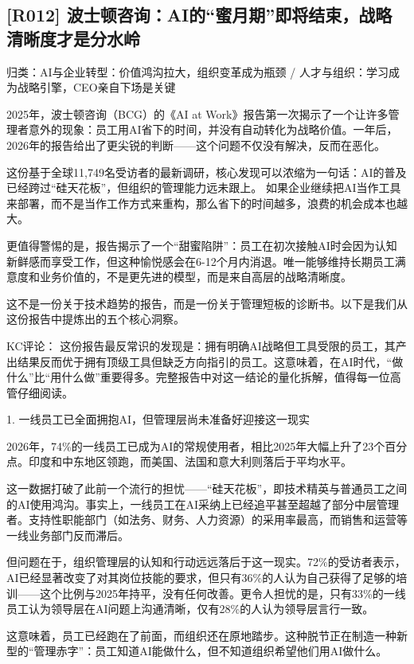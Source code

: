 \documentclass[11pt]{ctexart}
\begin{document}
\subsection{[R012] 波士顿咨询：AI的“蜜月期”即将结束，战略清晰度才是分水岭}
{\small\color{refgray}归类：AI与企业转型：价值鸿沟拉大，组织变革成为瓶颈 / 人才与组织：学习成为战略引擎，CEO亲自下场是关键}

2025年，波士顿咨询（BCG）的《AI at Work》报告第一次揭示了一个让许多管理者意外的现象：员工用AI省下的时间，并没有自动转化为战略价值。一年后，2026年的报告给出了更尖锐的判断——这个问题不仅没有解决，反而在恶化。

这份基于全球11,749名受访者的最新调研，核心发现可以浓缩为一句话：AI的普及已经跨过“硅天花板”，但组织的管理能力远未跟上。 如果企业继续把AI当作工具来部署，而不是当作工作方式来重构，那么省下的时间越多，浪费的机会成本也越大。

更值得警惕的是，报告揭示了一个“甜蜜陷阱”：员工在初次接触AI时会因为认知新鲜感而享受工作，但这种愉悦感会在6-12个月内消退。唯一能够维持长期员工满意度和业务价值的，不是更先进的模型，而是来自高层的战略清晰度。

这不是一份关于技术趋势的报告，而是一份关于管理短板的诊断书。以下是我们从这份报告中提炼出的五个核心洞察。

KC评论： 这份报告最反常识的发现是：拥有明确AI战略但工具受限的员工，其产出结果反而优于拥有顶级工具但缺乏方向指引的员工。这意味着，在AI时代，“做什么”比“用什么做”重要得多。完整报告中对这一结论的量化拆解，值得每一位高管仔细阅读。

1. 一线员工已全面拥抱AI，但管理层尚未准备好迎接这一现实

2026年，74\%的一线员工已成为AI的常规使用者，相比2025年大幅上升了23个百分点。印度和中东地区领跑，而美国、法国和意大利则落后于平均水平。

这一数据打破了此前一个流行的担忧——“硅天花板”，即技术精英与普通员工之间的AI使用鸿沟。事实上，一线员工在AI采纳上已经追平甚至超越了部分中层管理者。支持性职能部门（如法务、财务、人力资源）的采用率最高，而销售和运营等一线业务部门反而滞后。

但问题在于，组织管理层的认知和行动远远落后于这一现实。72\%的受访者表示，AI已经显著改变了对其岗位技能的要求，但只有36\%的人认为自己获得了足够的培训——这个比例与2025年持平，没有任何改善。更令人担忧的是，只有33\%的一线员工认为领导层在AI问题上沟通清晰，仅有28\%的人认为领导层言行一致。

这意味着，员工已经跑在了前面，而组织还在原地踏步。这种脱节正在制造一种新型的“管理赤字”：员工知道AI能做什么，但不知道组织希望他们用AI做什么。
\end{document}
